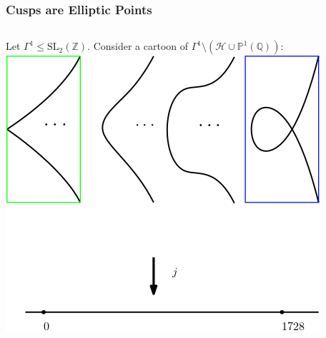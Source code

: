\documentclass[handout]{beamer}
\numberwithin{equation}{section}
\numberwithin{case}{theorem}
\newcommand{\cH}{\mathcal{H}}		%
\newcommand{\bbP}{\mathbb{P}}		%
\newcommand{\bbQ}{\mathbb{Q}}		%
\newcommand{\bbZ}{\mathbb{Z}}		%
\newcommand{\SL}{\mathrm{SL}} 	%
\newcommand{\<}{\left\langle}
\renewcommand{\>}{\right\rangle}
\begin{document}
\begin{frame}
	\end{frame}
	
	\begin{frame}
		\frametitle{Cusps are Elliptic Points}
		\begin{columns} 
			\begin{column}{.5\textwidth}
				Let $\Gamma^1\leq \SL_2(\bbZ).$ Consider a cartoon of $\Gamma^1\setminus(\cH\cup\bbP^1(\bbQ))$:
				\includegraphics[scale=0.25]{ell.png}
				

\end{column}
\end{columns}
\end{frame}
\end{document}
